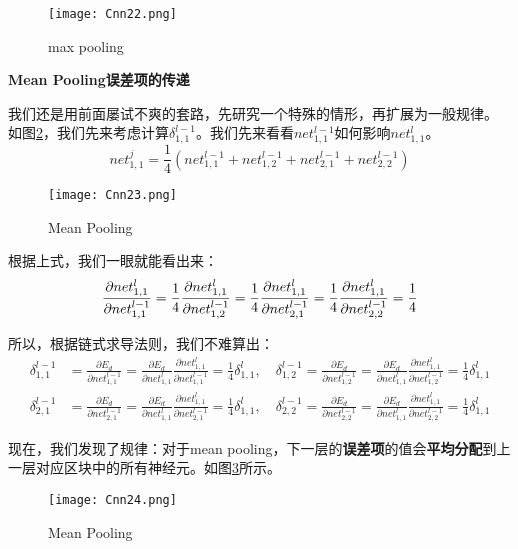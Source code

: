 \begin{figure}[!h]
	\centering
	\texttt{[image: Cnn22.png]}
	\caption{max pooling}
	\label{fig:Cnn22}
\end{figure}

\textbf{Mean Pooling误差项的传递}

我们还是用前面屡试不爽的套路，先研究一个特殊的情形，再扩展为一般规律。
如图\ref{fig:Cnn23}，我们先来考虑计算\(\delta^{l-1}_{1,1}\)。我们先来看看\(net^{l-1}_{1,1}\)如何影响\(net^l_{1,1}\)。
\[
	net^j_{1,1}=\frac{1}{4}(net^{l-1}_{1,1}+net^{l-1}_{1,2}+net^{l-1}_{2,1}+net^{l-1}_{2,2})
\]

\begin{figure}[!h]
	\centering
	\texttt{[image: Cnn23.png]}
	\caption{Mean Pooling}
	\label{fig:Cnn23}
\end{figure}
根据上式，我们一眼就能看出来：
\[
	\frac{\partial{net^l_{1,1}}}{\partial{net^{l-1}_{1,1}}}=\frac{1}{4}\\
	\frac{\partial{net^l_{1,1}}}{\partial{net^{l-1}_{1,2}}}=\frac{1}{4}\\
	\frac{\partial{net^l_{1,1}}}{\partial{net^{l-1}_{2,1}}}=\frac{1}{4}\\
	\frac{\partial{net^l_{1,1}}}{\partial{net^{l-1}_{2,2}}}=\frac{1}{4}\\
\]

所以，根据链式求导法则，我们不难算出：
\begin{align*}
	\delta^{l-1}_{1,1} & =\frac{\partial{E_d}}{\partial{net^{l-1}_{1,1}}}=\frac{\partial{E_d}}{\partial{net^{l}_{1,1}}}\frac{\partial{net^{l}_{1,1}}}{\partial{net^{l-1}_{1,1}}}=\frac{1}{4}\delta^{l}_{1,1}, \quad
	\delta^{l-1}_{1,2}=\frac{\partial{E_d}}{\partial{net^{l-1}_{1,2}}}=\frac{\partial{E_d}}{\partial{net^{l}_{1,1}}}\frac{\partial{net^{l}_{1,1}}}{\partial{net^{l-1}_{1,2}}}=\frac{1}{4}\delta^{l}_{1,1}           \\
	\delta^{l-1}_{2,1} & =\frac{\partial{E_d}}{\partial{net^{l-1}_{2,1}}}=\frac{\partial{E_d}}{\partial{net^{l}_{1,1}}}\frac{\partial{net^{l}_{1,1}}}{\partial{net^{l-1}_{2,1}}}=\frac{1}{4}\delta^{l}_{1,1}, \quad
	\delta^{l-1}_{2,2}=\frac{\partial{E_d}}{\partial{net^{l-1}_{2,2}}}=\frac{\partial{E_d}}{\partial{net^{l}_{1,1}}}\frac{\partial{net^{l}_{1,1}}}{\partial{net^{l-1}_{2,2}}}=\frac{1}{4}\delta^{l}_{1,1}
\end{align*}


现在，我们发现了规律：对于mean pooling，下一层的\textbf{误差项}的值会\textbf{平均分配}到上一层对应区块中的所有神经元。如图\ref{fig:Cnn24}所示。
\begin{figure}[!h]
	\centering
	\texttt{[image: Cnn24.png]}
	\caption{Mean Pooling}
	\label{fig:Cnn24}
\end{figure}


